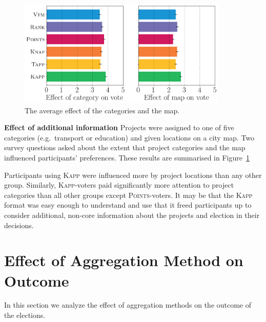 \documentclass{comsoc2023}
\newcommand{\points}{\textsc{Points}}
\newcommand{\kapp}{\textsc{Kapp}}
\newcommand{\mes}{ES}
\begin{document}
\begin{figure}[!h]
\begin{center}
\includegraphics[width=10cm]{experiment/survey2.png}
\caption{The average effect of the categories and the map.
}\label{fig:cat_map}
\end{center}\vspace{-5mm}
\end{figure}


\textbf{Effect of additional information}
Projects were assigned to one of five categories (e.g.\ transport or education) and given locations on a city map. Two survey questions asked about the extent that project categories and the map influenced participants' preferences. These results are summarised in Figure~\ref{fig:cat_map}

Participants using \kapp{} were influenced  more by project locations than any other group. Similarly, \kapp-voters paid significantly more attention to project categories than all other groups except \points-voters. 
It may be that the \kapp{} format was easy enough to understand and use that it freed participants up to consider additional, non-core information about the projects and   election in their decisions. 


\section{  Effect of Aggregation Method on Outcome}  


\label{sec:aggregation}
In  this section we  analyze the effect of aggregation methods  on the outcome of the elections.
\end{document}
